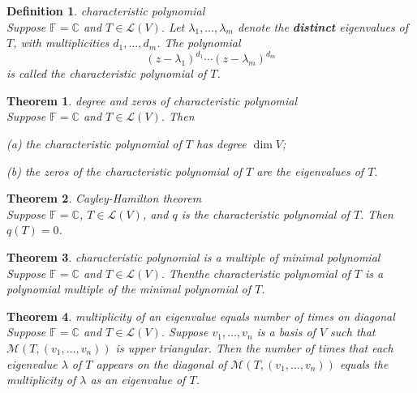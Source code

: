\documentclass{article}
\newtheorem{theorem}{Theorem}[subsection]
\newtheorem{definition}{Definition}[subsection]
\newcommand{\CC}{\mathbb{C}}
\newcommand{\FF}{\mathbb{F}}
\begin{document}
\begin{CJK}{UTF8}{gkai}
\begin{definition}
    characteristic polynomial\\

    Suppose $\FF = \CC$ and $T \in \mathcal{L}(V)$. Let $\lambda_1,\ldots, \lambda_m$ denote the \textbf{distinct} eigenvalues of $T$, with multiplicities $d_1,\ldots,d_m$. The polynomial
    \[(z - \lambda_1)^{d_1}\cdots(z - \lambda_m)^{d_m}\]
    is called the characteristic polynomial of $T$.
\end{definition}

\begin{theorem}
    degree and zeros of characteristic polynomial\\

    Suppose $\FF = \CC$ and $T \in \mathcal{L}(V)$. Then

    (a) the characteristic polynomial of $T$ has degree $\dim V$;

    (b) the zeros of the characteristic polynomial of $T$ are the eigenvalues of $T$.
\end{theorem}

\begin{theorem}
    Cayley-Hamilton theorem\\

    Suppose $\FF = \CC$, $T \in \mathcal{L}(V)$, and $q$ is the characteristic polynomial of $T$. Then $q(T) = 0$.
\end{theorem}

\begin{theorem}
    characteristic polynomial is a multiple of minimal polynomial\\

    Suppose $\FF = \CC$ and $T \in \mathcal{L}(V)$. Thenthe characteristic polynomial of $T$ is a polynomial multiple of the minimal polynomial of $T$.
\end{theorem}

\begin{theorem}
    multiplicity of an eigenvalue equals number of times on diagonal\\
    
    Suppose $\FF = \CC$ and $T \in \mathcal{L}(V)$. Suppose $v_1,\ldots,v_n$ is a basis of $V$ such that $\mathcal{M}(T,(v_1,\ldots,v_n))$ is upper triangular. Then the number of times that each eigenvalue $\lambda$ of $T$ appears on the diagonal of $\mathcal{M}(T,(v_1,\ldots,v_n))$ equals the multiplicity of $\lambda$ as an eigenvalue of $T$.
\end{theorem}


\end{CJK}
\end{document}
